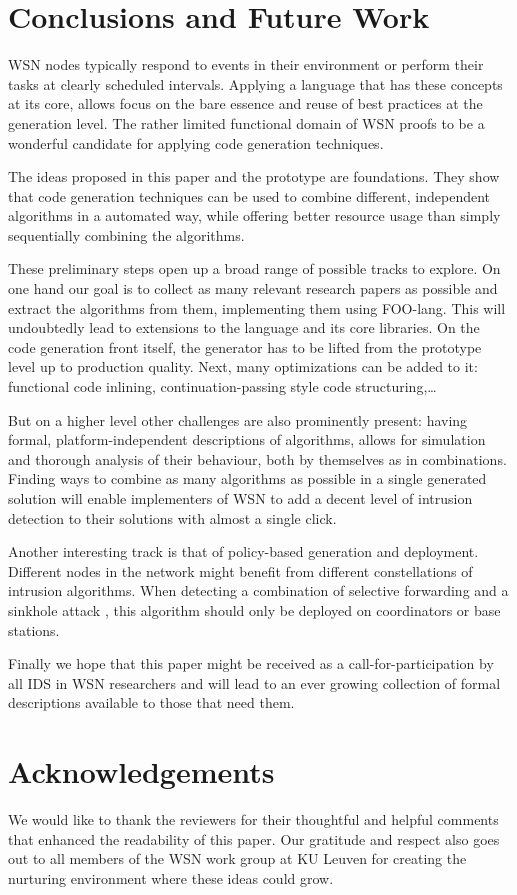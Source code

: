 \documentclass[conference]{IEEEtran}
\begin{document}
\section{Conclusions and Future Work}
\label{section:conclusions}

WSN nodes typically respond to events in their environment or perform their
tasks at clearly scheduled intervals. Applying a language that has these
concepts at its core, allows focus on the bare essence and reuse of best
practices at the generation level. The rather limited functional domain of WSN
proofs to be a wonderful candidate for applying code generation techniques.

The ideas proposed in this paper and the prototype are foundations. They show
that code generation techniques can be used to combine different, independent
algorithms in a automated way, while offering better resource usage than simply
sequentially combining the algorithms.

These preliminary steps open up a broad range of possible tracks to explore. On
one hand our goal is to collect as many relevant research papers as possible
and extract the algorithms from them, implementing them using FOO-lang. This
will undoubtedly lead to extensions to the language and its core libraries. On
the code generation front itself, the generator has to be lifted from the
prototype level up to production quality. Next, many optimizations can be added
to it: functional code inlining, continuation-passing style code
structuring,\dots

But on a higher level other challenges are also prominently present: having
formal, platform-independent descriptions of algorithms, allows for simulation
and thorough analysis of their behaviour, both by themselves as in
combinations. Finding ways to combine as many algorithms as possible in a
single generated solution will enable implementers of WSN to add a decent level
of intrusion detection to their solutions with almost a single click.

Another interesting track is that of policy-based generation and deployment.
Different nodes in the network might benefit from different constellations of
intrusion algorithms. When detecting a combination of selective forwarding and
a sinkhole attack \cite{ngai2006intruder}, this algorithm should only be
deployed on coordinators or base stations.

Finally we hope that this paper might be received as a call-for-participation
by all IDS in WSN researchers and will lead to an ever growing collection of
formal descriptions available to those that need them.

\section*{Acknowledgements}
\label{section:acknowledgements}

We would like to thank the reviewers for their thoughtful and helpful comments
that enhanced the readability of this paper. Our gratitude and respect also
goes out to all members of the WSN work group at KU Leuven for creating the
nurturing environment where these ideas could grow.



\end{document}
